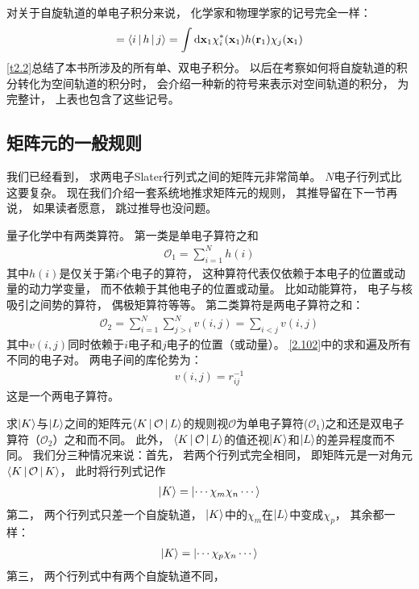 对关于自旋轨道的单电子积分来说，
化学家和物理学家的记号完全一样：
\begin{align}
[i|h|j]=\braket{i|h|j}=\int\ddx_1\chi_i^*(\bo{x}_1)h(\bo{r}_1)\chi_j(\bo{x}_1)
\end{align}
\autoref{t2.2}总结了本书所涉及的所有单、双电子积分。
以后在考察如何将自旋轨道的积分转化为空间轨道的积分时，
会介绍一种新的符号来表示对空间轨道的积分，
为完整计，
上表也包含了这些记号。



\subsection{矩阵元的一般规则}
\label{sec2.3.3}
我们已经看到，
求两电子Slater行列式之间的矩阵元非常简单。
$N$电子行列式比这要复杂。
现在我们介绍一套系统地推求矩阵元的规则，
其推导留在下一节再说，
如果读者愿意，
跳过推导也没问题。


量子化学中有两类算符。
第一类是单电子算符之和
\begin{align}
\mathcal{O}_1=\sum_{i=1}^N h(i)
\end{align}
其中$h(i)$是仅关于第$i$个电子的算符，
这种算符代表仅依赖于本电子的位置或动量的动力学变量，
而不依赖于其他电子的位置或动量。
比如动能算符，
电子与核吸引之间势的算符，
偶极矩算符等等。
第二类算符是两电子算符之和：
\begin{align}
\label{2.102}
\mathcal{O}_2 = \sum_{i=1}^{N}\sum_{j>i}^N v(i,j)=\sum_{i<j}v(i,j)
\end{align}
其中$v(i,j)$同时依赖于$i$电子和$j$电子的位置（或动量）。
\autoref{2.102}中的求和遍及所有不同的电子对。
两电子间的库伦势为：
\begin{align}
v(i,j)=r_{ij}^{-1}
\end{align}
这是一个两电子算符。


求$\Ket{K}$与$\Ket{L}$之间的矩阵元$\Braket{K|\mathcal{O}|L}$的规则视$\mathcal{O}$为单电子算符($\mathcal{O}_1$)之和还是双电子算符（$\mathcal{O}_2$）之和而不同。
此外，
$\Braket{K|\mathcal{O}|L}$的值还视$\Ket{K}$和$\Ket{L}$的差异程度而不同。
我们分三种情况来说：首先，
若两个行列式完全相同，
即矩阵元是一对角元$\Braket{K|\mathcal{O}|K}$，
此时将行列式记作
\begin{align}
\Ket{K}=\Ket{\cdots\chi_m\chi_n\cdots}
\end{align}
第二，
两个行列式只差一个自旋轨道，
$\Ket{K}$中的$\chi_m$在$\Ket{L}$中变成$\chi_p$，
其余都一样：
\begin{align}
\Ket{K}=\Ket{\cdots\chi_p\chi_n\cdots}
\end{align}
第三，
两个行列式中有两个自旋轨道不同，

